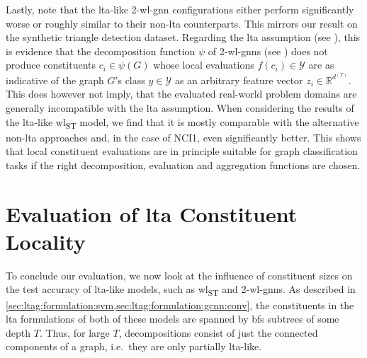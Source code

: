 Lastly, note that the \acs{lta}-like 2-\acs{wl}-\acs{gnn} configurations either perform significantly worse or roughly similar to their non-\acs{lta} counterparts.
This mirrors our result on the synthetic triangle detection dataset.
Regarding the \acs{lta} assumption (see ), this is evidence that the decomposition function $\psi$ of 2-\acs{wl}-\acsp{gnn} (see ) does not produce constituents $c_i \in \psi(G)$ whose local evaluations $f(c_i) \in \mathcal{Y}$ are as indicative of the graph $G$'s class $y \in \mathcal{Y}$ as an arbitrary feature vector $z_i \in \mathbb{R}^{d^{(T)}}$.
This does however not imply, that the evaluated real-world problem domains are generally incompatible with the \ac{lta} assumption.
When considering the results of the \ac{lta}-like \acs{wl}\textsubscript{ST} model, we find that it is mostly comparable with the alternative non-\acs{lta} approaches and, in the case of NCI1, even significantly better.
This shows that local constituent evaluations are in principle suitable for graph classification tasks if the right decomposition, evaluation and aggregation functions are chosen.

\section{Evaluation of \acs*{lta} Constituent Locality}%
\label{sec:eval:lta}

To conclude our evaluation, we now look at the influence of constituent sizes on the test accuracy of \acs{lta}-like models, such as \acs{wl}\textsubscript{ST} and 2-\acs{wl}-\acsp{gnn}.
As described in \cref{sec:ltag:formulation:svm,sec:ltag:formulation:gcnn:conv}, the constituents in the \ac{lta} formulations of both of these models are spanned by \ac{bfs} subtrees of some depth $T$.
Thus, for large $T$, decompositions consist of just the connected components of a graph, i.e.\ they are only partially \acs{lta}-like.

